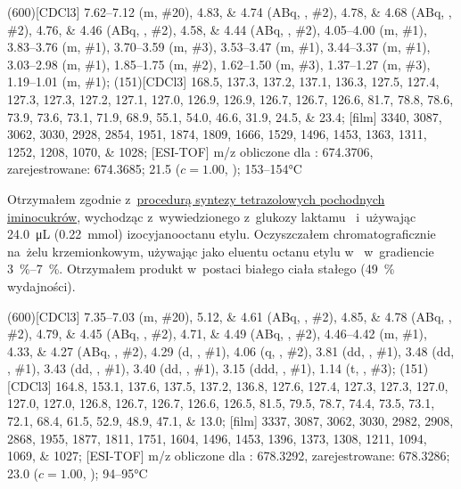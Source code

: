 \begin{fullexp}
  \NMR(600)[CDCl3] \numrange{7.62}{7.12} (m, \#{20}), \numlist{4.83;4.74} (ABq, , \#{2}), \numlist{4.78;4.68} (ABq, , \#{2}), \numlist{4.76;4.46} (ABq, , \#{2}), \numlist{4.58;4.44} (ABq, , \#{2}), \numrange{4.05}{4.00} (m, \#{1}), \numrange{3.83}{3.76} (m, \#{1}), \numrange{3.70}{3.59} (m, \#{3}), \numrange{3.53}{3.47} (m, \#{1}), \numrange{3.44}{3.37} (m, \#{1}), \numrange{3.03}{2.98} (m, \#{1}), \numrange{1.85}{1.75} (m, \#{2}), \numrange{1.62}{1.50} (m, \#{3}), \numrange{1.37}{1.27} (m, \#{3}), \numrange{1.19}{1.01} (m, \#{1});
  (151)[CDCl3] \numlist{168.5; 137.3; 137.2; 137.1; 136.3; 127.5; 127.4; 127.3; 127.3; 127.2; 127.1; 127.0; 126.9; 126.9; 126.7; 126.7; 126.6; 81.7; 78.8; 78.6; 73.9; 73.6; 73.1; 71.9; 68.9; 55.1; 54.0; 46.6; 31.9; 24.5; 23.4};
  [film] \numlist{3340; 3087; 3062; 3030; 2928; 2854; 1951; 1874; 1809; 1666; 1529; 1496; 1453; 1363; 1311; 1252; 1208; 1070; 1028};
  [ESI-TOF] m/z obliczone dla : \num{674.3706}, zarejestrowane: \num{674.3685};
  \data{[$\alpha^{23}_D$]~$=$} \num{21.5} ($c = 1.00$, );
   \numrange{153}{154}\si{\celsius}
\end{fullexp}

Otrzymałem zgodnie z~\hyperref[experimental:sugars:schwartz]{procedurą syntezy tetrazolowych
  pochodnych iminocukrów}, wychodząc z~wywiedzionego z~glukozy laktamu~
  i~używając \SI{24.0}{\micro\liter} (\SI{0.22}{\milli\mol}) izocyjanooctanu etylu.
Oczyszczałem chromatograficznie na~żelu krzemionkowym,
  używając jako eluentu octanu etylu w~ w~gradiencie \SIrange{3}{7}{\percent}.
Otrzymałem produkt w~postaci białego ciała stałego (\SI{49}{\percent} wydajności).

\begin{fullexp}
  \NMR(600)[CDCl3] \numrange{7.35}{7.03} (m, \#{20}), \numlist{5.12;4.61} (ABq, , \#{2}), \numlist{4.85;4.78} (ABq, , \#{2}), \numlist{4.79;4.45} (ABq, , \#{2}), \numlist{4.71;4.49} (ABq, , \#{2}), \numrange{4.46}{4.42} (m, \#{1}), \numlist{4.33;4.27} (ABq, , \#{2}), \num{4.29} (d, , \#{1}), \num{4.06} (q, , \#{2}), \num{3.81} (dd, , \#{1}), \num{3.48} (dd, , \#{1}), \num{3.43} (dd, , \#{1}), \num{3.40} (dd, , \#{1}), \num{3.15} (ddd, , \#{1}), \num{1.14} (t, , \#{3});
  (151)[CDCl3] \numlist{164.8; 153.1; 137.6; 137.5; 137.2; 136.8; 127.6; 127.4; 127.3; 127.3; 127.0; 127.0; 127.0; 126.8; 126.7; 126.7; 126.6; 126.5; 81.5; 79.5; 78.7; 74.4; 73.5; 73.1; 72.1; 68.4; 61.5; 52.9; 48.9; 47.1; 13.0};
  [film] \numlist{3337; 3087; 3062; 3030; 2982; 2908; 2868; 1955; 1877; 1811; 1751; 1604; 1496; 1453; 1396; 1373; 1308; 1211; 1094; 1069; 1027};
  [ESI-TOF] m/z obliczone dla : \num{678.3292}, zarejestrowane: \num{678.3286};
  \data{[$\alpha^{23}_D$]~$=$} \num{23.0} ($c = 1.00$, );
   \numrange{94}{95}\si{\celsius}
\end{fullexp}

